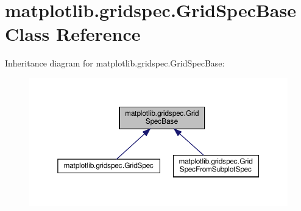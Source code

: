 \hypertarget{classmatplotlib_1_1gridspec_1_1GridSpecBase}{}\section{matplotlib.\+gridspec.\+Grid\+Spec\+Base Class Reference}
\label{classmatplotlib_1_1gridspec_1_1GridSpecBase}


Inheritance diagram for matplotlib.\+gridspec.\+Grid\+Spec\+Base\+:
\nopagebreak
\begin{figure}[H]
\begin{center}
\leavevmode
\includegraphics[width=350pt]{classmatplotlib_1_1gridspec_1_1GridSpecBase__inherit__graph}
\end{center}
\end{figure}
